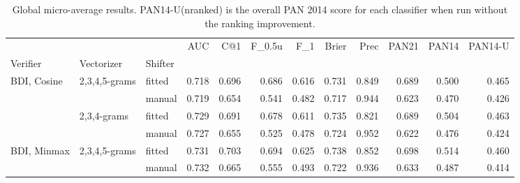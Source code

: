 \documentclass[
    hf
]{ceurart}
\begin{document}
\begin{table}
    \caption{Global micro-average results. PAN14-U(nranked) is the overall PAN 2014 score 
    for each classifier when run without the ranking improvement.}
    \label{tab:micro}
    \begin{adjustbox}{max width=\textwidth}
        \begin{tabular}{lllrrrrrrrrr}
            \toprule
                                                      &                                     &         & AUC            & C@1            & F_{0.5u}        & F_1            & Brier          & Prec           & PAN21          & PAN14          & PAN14-U        \\
            Verifier                                  & Vectorizer                          & Shifter &                &                &                &                &                &                &                &                &                \\
            \midrule
            \multirow[c]{4}{*}{BDI, Cosine }          & \multirow[c]{2}{*}{ 2,3,4,5-grams } & fitted  & 0.718          & 0.696          & 0.686          & 0.616          & 0.731          & 0.849          & 0.689          & 0.500          & 0.465          \\
                                                      &                                     & manual  & 0.719          & 0.654          & 0.541          & 0.482          & 0.717          & 0.944          & 0.623          & 0.470          & 0.426          \\
                                                      & \multirow[c]{2}{*}{ 2,3,4-grams }   & fitted  & 0.729          & 0.691          & 0.678          & 0.611          & 0.735          & 0.821          & 0.689          & 0.504          & 0.463          \\
                                                      &                                     & manual  & 0.727          & 0.655          & 0.525          & 0.478          & 0.724          & 0.952          & 0.622          & 0.476          & 0.424          \\
            \multirow[c]{4}{*}{BDI, Minmax }          & \multirow[c]{2}{*}{ 2,3,4,5-grams } & fitted  & 0.731          & 0.703          & 0.694          & 0.625          & 0.738          & 0.852          & 0.698          & 0.514          & 0.460          \\
                                                      &                                     & manual  & 0.732          & 0.665          & 0.555          & 0.493          & 0.722          & 0.936          & 0.633          & 0.487          & 0.414          \\

\end{tabular}
\end{adjustbox}
\end{table}
\end{document}
